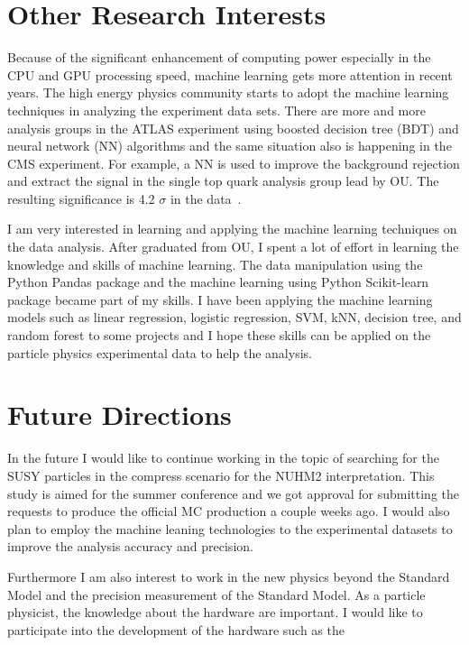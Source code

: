 \documentclass[12pt]{article}
\begin{document}
\section{Other Research Interests}
Because of the significant enhancement of computing power especially in the CPU and GPU processing speed, machine learning gets more attention in recent years. 
The high energy physics community starts to adopt the machine learning techniques in analyzing the experiment data sets.
There are more and more analysis groups in the ATLAS experiment using boosted decision tree (BDT) and neural network (NN) algorithms and the same situation also is happening in the CMS experiment.
For example, a NN is used to improve the background rejection and extract the signal in the single top quark analysis group lead by OU. The resulting significance is 4.2 $\sigma$ in the data~\cite{Aaboud:2017ylb}.

I am very interested in learning and applying the machine learning techniques on the  data analysis.
After graduated from OU, I spent a lot of effort in learning the knowledge and skills of  machine learning.
The data manipulation using the Python Pandas package and the machine learning using Python Scikit-learn package became part of my skills.
I have been applying the machine learning models such as linear regression, logistic regression, SVM, kNN, decision tree, and random forest to some projects and I hope these skills can be applied on the particle physics experimental data to help the analysis.


\section{Future Directions}
In the future I would like to continue working in the topic of searching for the SUSY particles in the compress scenario for the NUHM2 interpretation.
This study is aimed for the summer conference and we got approval for submitting the requests to produce the official MC production a couple weeks ago.
I would also plan to employ the machine leaning technologies to the experimental datasets to improve the analysis accuracy and precision.

Furthermore I am also interest to work in the new physics beyond the Standard Model and the precision measurement of the Standard Model.
As a particle physicist, the knowledge about the hardware are important.
I would like to participate into the development of the hardware such as the 
\end{document}
